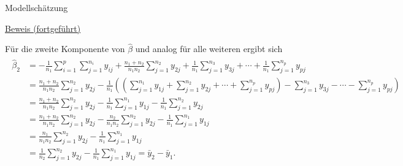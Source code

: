 \documentclass[
  8pt,
  ignorenonframetext,
]{beamer}
\begin{document}
\begin{frame}{Modellschätzung}
\protect\hypertarget{modellschuxe4tzung-5}{}
\footnotesize
\vspace{2mm}

\underline{Beweis (fortgeführt)}

Für die zweite Komponente von \(\hat{\beta}\) und analog für alle
weiteren ergibt sich \tiny \begin{align}
\begin{split}
\hat{\beta}_2
& =
- \frac{1}{n_1}            \sum_{i=1}^p \sum_{j=1}^{n_i} y_{ij}
+ \frac{n_1 + n_2}{n_1n_2} \sum_{j=1}^{n_2} y_{2j}
+ \frac{1}{n_1}            \sum_{j=1}^{n_3} y_{3j}
+ \cdots
+  \frac{1}{n_1}           \sum_{j=1}^{n_p} y_{pj}
\\
& =
\frac{n_1 + n_2}{n_1n_2} \sum_{j=1}^{n_2} y_{2j}
-\frac{1}{n_1}
\left(
\left(
 \sum_{j=1}^{n_1} y_{1j}
+ \sum_{j=1}^{n_2} y_{2j}
+ \cdots
+ \sum_{j=1}^{n_p} y_{pj}
\right)
- \sum_{j=1}^{n_3} y_{3j}
- \cdots
- \sum_{j=1}^{n_p} y_{pj}
\right)
\\
& =
 \frac{n_1 + n_2}{n_1n_2} \sum_{j=1}^{n_2} y_{2j}
-\frac{1}{n_1}            \sum_{j=1}^{n_1} y_{1j}
-\frac{1}{n_1}            \sum_{j=1}^{n_2} y_{2j}
\\
& =
 \frac{n_1+n_2}{n_1n_2} \sum_{j=1}^{n_2} y_{2j}
-\frac{n_2}{n_1n_2}     \sum_{j=1}^{n_2} y_{2j}
-\frac{1}{n_1}          \sum_{j=1}^{n_1} y_{1j}
\\
& =
 \frac{n_1}{n_1n_2} \sum_{j=1}^{n_2} y_{2j}
-\frac{1}{n_1}          \sum_{j=1}^{n_1} y_{1j}
\\
& =
 \frac{1}{n_2} \sum_{j=1}^{n_2} y_{2j}
-\frac{1}{n_1} \sum_{j=1}^{n_1} y_{1j}
= \bar{y}_2 - \bar{y}_1.
\end{split}
\end{align}
\end{frame}
\end{document}
